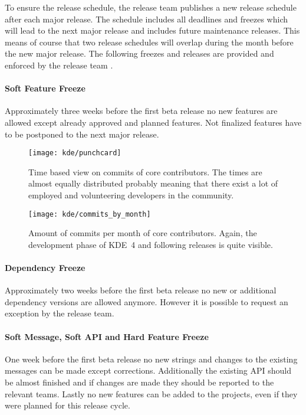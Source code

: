 To ensure the release schedule, the release team publishes a new release
schedule after each major release. The schedule includes all deadlines and
freezes which will lead to the next major release and includes future
maintenance releases. This means of course that two release schedules will
overlap during the month before the new major release. The following freezes
and releases are provided and enforced by the release team
\cite{KDEReleaseSchedule}.

\paragraph{Soft Feature Freeze}

Approximately three weeks before the first beta release no new features are
allowed except already approved and planned features. Not finalized features
have to be postponed to the next major release.

\begin{figure}[hbtp]
  \centering
  \texttt{[image: kde/punchcard]}
  \caption[Time Based View on Commits, KDE]
  {Time based view on commits of core contributors. The times are almost
    equally distributed probably meaning that there exist a lot of employed and
    volunteering developers in the community.}
\end{figure}

\begin{figure}[htbp]
  \centering
  \texttt{[image: kde/commits\_by\_month]}
  \caption[Commits by Month, KDE]
  {Amount of commits per month of core contributors. Again, the development
    phase of KDE~4 and following releases is quite visible.}
\end{figure}

\paragraph{Dependency Freeze}

Approximately two weeks before the first beta release no new or additional
dependency versions are allowed anymore. However it is possible to request an
exception by the release team.

\paragraph{Soft Message, Soft API and Hard Feature Freeze}

One week before the first beta release no new strings and changes to the
existing messages can be made except corrections. Additionally the existing
\ac{API} should be almost finished and if changes are made they should be
reported to the relevant teams. Lastly no new features can be added to the
projects, even if they were planned for this release cycle.

